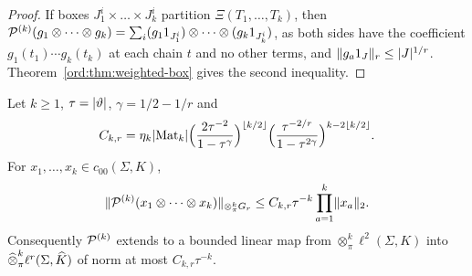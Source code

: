 \begin{proof}
If boxes $J^i_1\times\dots\times J^i_k$ partition $\Xi(T_1,\dots,T_k)$, then
$\mathcal P^{(k)}(g_1\otimes\dots\otimes g_k)=\sum_i(g_11_{J^i_1})\otimes\dots\otimes(g_k1_{J^i_k})$, as both sides have the
coefficient $g_1(t_1)\cdots g_k(t_k)$ at each chain $t$ and no other terms, and $\lVert g_a1_J\rVert_r\le\lvert J\rvert^{1/r}$.
Theorem~\ref{ord:thm:weighted-box} gives the second inequality.
\end{proof}

\begin{theorem}\label{ord:thm:triangle}
Let $k\ge1$, $\tau=\lvert \vartheta\rvert$, $\gamma=1/2-1/r$ and
\[
 C_{k,r}=\eta_k\lvert \operatorname{Mat}_k\rvert\Bigl(\frac{2\tau^{-2}}{1-\tau^\gamma}\Bigr)^{\lfloor k/2\rfloor}
 \Bigl(\frac{\tau^{-2/r}}{1-\tau^{2\gamma}}\Bigr)^{k-2\lfloor k/2\rfloor}.
\]
For $x_1,\dots,x_k\in c_{00}(\Sigma,K)$,
\begin{equation}\label{ord:eq:triangle}
 \lVert \mathcal P^{(k)}(x_1\otimes\dots\otimes x_k)\rVert_{\otimes^k_\pi G_r}\le C_{k,r}\tau^{-k}\prod_{a=1}^k\lVert x_a\rVert_2 .
\end{equation}
Consequently $\mathcal P^{(k)}$ extends to a bounded linear map from $\otimes^k_\pi\ell^2(\Sigma,K)$ into
$\widehat\otimes^k_\pi\ell^r(\Sigma,\widehat K)$ of norm at most $C_{k,r}\tau^{-k}$.
\end{theorem}

